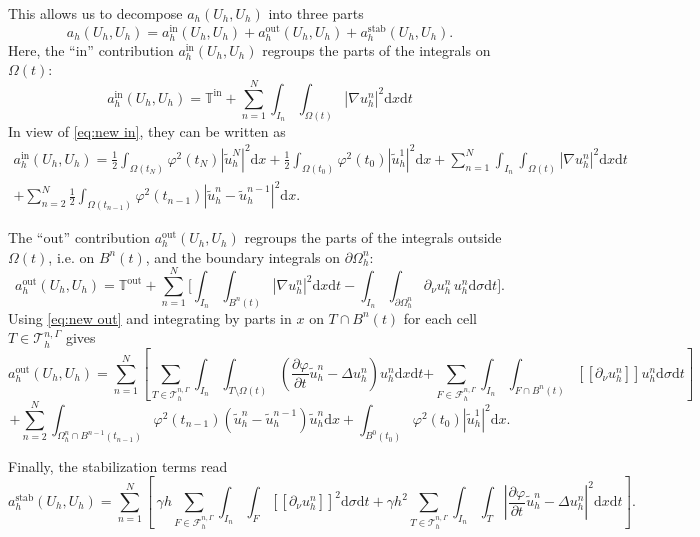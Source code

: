 \documentclass[11pt,a4paper]{article}
\theoremstyle{plain}
\theoremstyle{definition}
\theoremstyle{remark}
\numberwithin{equation}{section}
\newcommand{\dx}{\mathrm{d}x}
\newcommand{\dsigma}{\mathrm{d}\sigma}
\newcommand{\dt}{\mathrm{d}t}
\begin{document}
This allows us to decompose $a_h (U_h, U_h)$ into three parts
\begin{equation}
  \label{3termsIOS} a_h (U_h, U_h) = a_h^{\text{in}} (U_h, U_h) +
  a_h^{\text{out}} (U_h, U_h) + a_h^{\text{stab}} (U_h, U_h) .
\end{equation}
Here, the ``in'' contribution $a_h^{\text{in}} (U_h, U_h)$ regroups the parts
of the integrals on $\Omega (t)$:
\[ a_h^{\text{in}} (U_h, U_h) = \mathbb{T}^{\text{in}}
+ \sum_{n = 1}^N \int_{I_n} \int_{\Omega
   (t)} | \nabla u^n_h |^2 \dx \dt \]
In view of \eqref{eq:new in}, they can be written as
\begin{multline*}
a_h^{\text{in}} (U_h, U_h) = \frac{1}{2}  \int_{\Omega (t_N)} \varphi^2 (t_N)
   | \tilde{u}_h^N |^2 \dx + \frac{1}{2}  \int_{\Omega (t_0)} \varphi^2
   (t_0) | \tilde{u}_h^1 |^2 \dx + \sum_{n = 1}^N \int_{I_n} \int_{\Omega
   (t)} | \nabla u^n_h |^2 \dx \dt \\
 + \sum_{n = 2}^N \frac{1}{2}  \int_{\Omega (t_{n - 1})} \varphi^2 (t_{n - 1})
   | \tilde{u}_h^n - \tilde{u}_h^{n - 1} |^2 \dx.
   \end{multline*}


The ``out'' contribution $a_h^{\text{out}} (U_h, U_h)$ regroups the parts of
the integrals outside $\Omega (t)$, i.e. on $B^n (t)$, and the boundary
integrals on $\partial \Omega_h^n$: \
\[ a_h^{\text{out}} (U_h, U_h) = \mathbb{T}^{\text{out}}
+ \sum_{n = 1}^N \Bigg[ \int_{I_n} \int_{B ^n (t)} |\nabla u^n_h|^2 \dx \dt
- \int_{I_n} \int_{\partial\Omega_h^n} \partial_{\nu}{u^n_h} \, u^n_h \dsigma \dt \Bigg].
\]
Using \eqref{eq:new out} and integrating by parts in $x$ on $T \cap B^n (t)$
for each cell $T \in\mathcal{T}^{n, \Gamma}_h$ gives
\[ a_h^{\text{out}} (U_h, U_h) = \sum_{n = 1}^N \left[ \sum_{T\in\mathcal{T}_h^{n,\Gamma}}\int_{I_n}
   \int_{T \setminus \Omega (t)} \left( \frac{\partial
   \varphi}{\partial t}  \tilde{u}_h^n - \Delta u^n_h \right) u^n_h \dx
   \dt \right. \left. + \sum_{F\in\mathcal{F}_h^{n, \Gamma}} \int_{I_n}  \int_{F \cap
   B^n (t)} [\![\partial_\nu u^n_h]\!] u^n_h \dsigma \dt \right] \]
\[ + \sum_{n = 2}^N \int_{\Omega^n_h \cap B^{n - 1} (t_{n - 1})} \varphi^2 (t_{n- 1})  (\tilde{u}_h^n - \tilde{u}_h^{n - 1})  \tilde{u}_h^n \dx
+\int_{B^0 (t_0)} \varphi^2 (t_0) | \tilde{u}_h^1 |^2 \dx. \]

Finally, the stabilization terms read
\[ a_h^{\text{stab}} (U_h, U_h) = \sum_{n = 1}^N \left[ \ \gamma
   h \sum_{F\in\mathcal{F}_h^{n, \Gamma}} \int_{I_n}  \int_{F}  [\![\partial_\nu u^n_h]\!]^2 \dsigma \dt + \gamma h^2  \sum_{T\in\mathcal{T}_h^{n,\Gamma}} \int_{I_n} \int_{T} \left| \frac{\partial \varphi}{\partial t}  \tilde{u}^n_h - \Delta u^n_h \right|^2 \dx \dt \right]. \]
\end{document}
